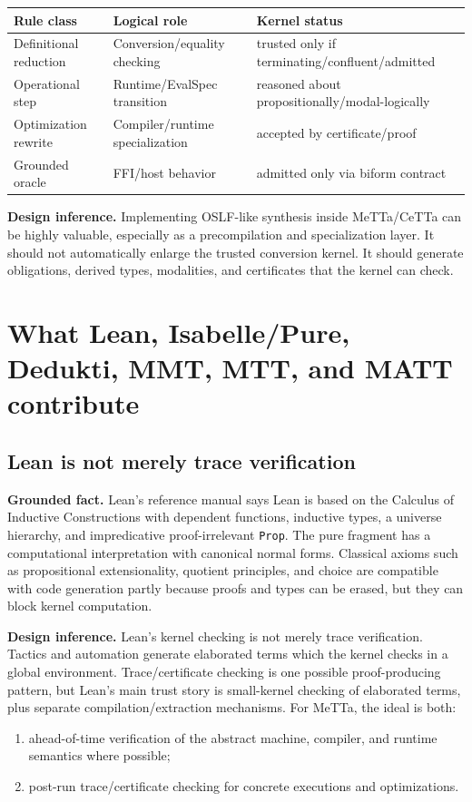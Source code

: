 \documentclass[11pt]{article}
\newcommand{\MeTTa}{\textup{MeTTa}}
\newcommand{\OSLF}{\textup{OSLF}}
\newcommand{\Lean}{\textup{Lean}}
\newcommand{\code}[1]{\texttt{#1}}
\newcommand{\Fact}{\textbf{Grounded fact.}}
\newcommand{\Infer}{\textbf{Design inference.}}
\begin{document}
\begin{center}
\begin{tabular}{@{}lll@{}}
\toprule
Rule class & Logical role & Kernel status \\
\midrule
Definitional reduction & Conversion/equality checking & trusted only if terminating/confluent/admitted \\
Operational step & Runtime/EvalSpec transition & reasoned about propositionally/modal-logically \\
Optimization rewrite & Compiler/runtime specialization & accepted by certificate/proof \\
Grounded oracle & FFI/host behavior & admitted only via biform contract \\
\bottomrule
\end{tabular}
\end{center}

\Infer{} Implementing \OSLF{}-like synthesis inside \MeTTa{}/CeTTa can be highly valuable, especially as a precompilation and specialization layer.  It should not automatically enlarge the trusted conversion kernel.  It should generate obligations, derived types, modalities, and certificates that the kernel can check.

\section{What Lean, Isabelle/Pure, Dedukti, MMT, MTT, and MATT contribute}

\subsection{Lean is not merely trace verification}

\Fact{} \Lean{}'s reference manual says Lean is based on the Calculus of Inductive Constructions with dependent functions, inductive types, a universe hierarchy, and impredicative proof-irrelevant \code{Prop}.  The pure fragment has a computational interpretation with canonical normal forms.  Classical axioms such as propositional extensionality, quotient principles, and choice are compatible with code generation partly because proofs and types can be erased, but they can block kernel computation.\cite{lean-axioms}

\Infer{} Lean's kernel checking is not merely trace verification.  Tactics and automation generate elaborated terms which the kernel checks in a global environment.  Trace/certificate checking is one possible proof-producing pattern, but Lean's main trust story is small-kernel checking of elaborated terms, plus separate compilation/extraction mechanisms.  For \MeTTa{}, the ideal is both:
\begin{enumerate}
\item ahead-of-time verification of the abstract machine, compiler, and runtime semantics where possible;
\item post-run trace/certificate checking for concrete executions and optimizations.
\end{enumerate}
\end{document}
